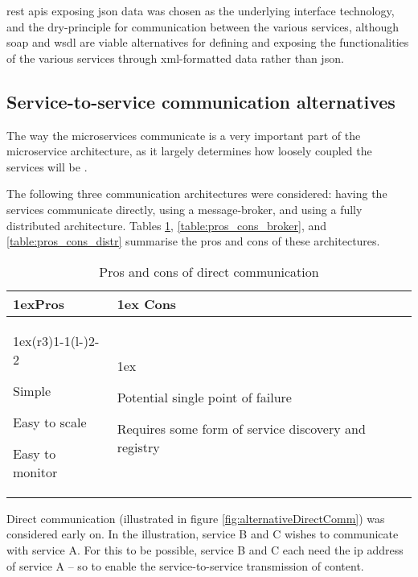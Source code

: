 \acrshort{rest} \acrshort{api}s exposing \acrshort{json} data was chosen as the underlying interface technology, and the \acrshort{dry}-principle for communication between the various services, although \acrshort{soap} and \acrshort{wsdl} are viable alternatives for defining and exposing the functionalities of the various services through \acrshort{xml}-formatted data rather than \acrshort{json}.


\subsection{Service-to-service communication alternatives}\label{subsec:alternative_arch}
The way the microservices communicate is a very important part of the microservice architecture, as it largely determines how loosely coupled the services will be \citep{pwcMicroservices}.

The following three communication architectures were considered: having the services communicate directly, using a message-broker, and using a fully distributed architecture.
Tables \ref{table:pros_cons_gateway}, \ref{table:pros_cons_broker}, and \ref{table:pros_cons_distr} summarise the pros and cons of these architectures.

\begin{table}[H]
\caption{Pros and cons of direct communication} 
\begin{tabularx}{\linewidth}{>{\parskip1ex}X@{\kern4\tabcolsep}>{\parskip1ex}X}
\toprule
\hfil\bfseries Pros & \hfil\bfseries Cons\\
\cmidrule(r{3\tabcolsep}){1-1}\cmidrule(l{-\tabcolsep}){2-2}

Simple\par
Easy to scale\par
Easy to monitor\par

&

Potential single point of failure\par
Requires some form of service discovery and registry\par

\end{tabularx}
\label{table:pros_cons_gateway}
\end{table}

Direct communication (illustrated in figure \ref{fig:alternativeDirectComm}) was considered early on. In the illustration, service B and C wishes to communicate with service A. For this to be possible, service B and C each need the \acrshort{ip} address of service A -- so to enable the service-to-service transmission of content.

